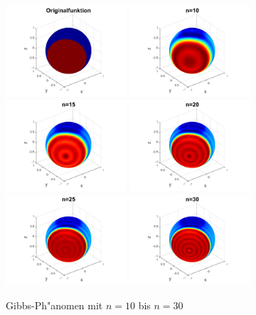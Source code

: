 \begin{refsection}
\begin{figure}%
\includegraphics[width=0.4\textwidth]{kugel/Gibbs/GibbsOriginalFunktion.pdf}
\includegraphics[width=0.4\textwidth]{kugel/Gibbs/GibbsN_10.pdf}
\includegraphics[width=0.4\textwidth]{kugel/Gibbs/GibbsN_15.pdf}
\includegraphics[width=0.4\textwidth]{kugel/Gibbs/GibbsN_20.pdf}
\includegraphics[width=0.4\textwidth]{kugel/Gibbs/GibbsN_25.pdf}
\includegraphics[width=0.4\textwidth]{kugel/Gibbs/GibbsN_30.pdf}
\caption{Gibbs-Ph"anomen mit $n=10$ bis $n=30$
\label{skript:Gibbs2}}
\end{figure}

\printbibliography[heading=subbibliography]
\end{refsection}
